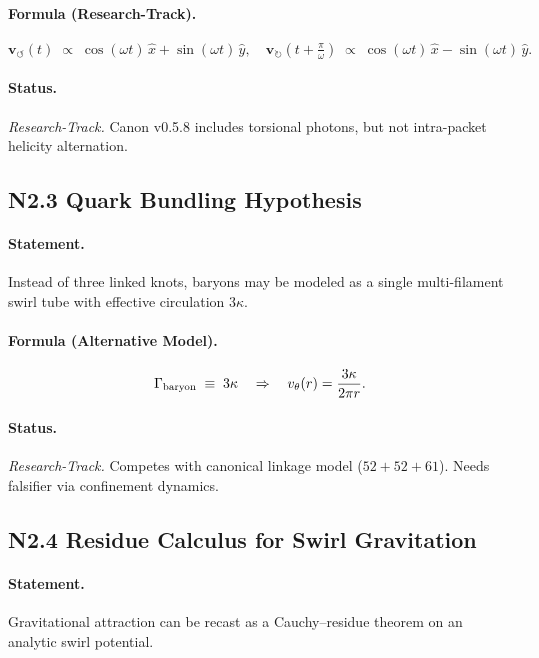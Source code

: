 \documentclass[10pt,reprint,aps,onecolumn,nofootinbib]{revtex4-2}
\begin{document}
    \paragraph{Formula (Research-Track).}
        \[
            \mathbf{v}_{\!\boldsymbol{\circlearrowleft}}(t) \;\propto\;
            \cos(\omega t)\,\hat{x} + \sin(\omega t)\,\hat{y},
            \quad
            \mathbf{v}_{\!\boldsymbol{\circlearrowright}}(t+\tfrac{\pi}{\omega})\;\propto\;
            \cos(\omega t)\,\hat{x} - \sin(\omega t)\,\hat{y}.
        \]

    \paragraph{Status.} \emph{Research-Track.} Canon v0.5.8 includes torsional photons, but not
        intra-packet helicity alternation.

    \subsection*{N2.3 Quark Bundling Hypothesis}
    \paragraph{Statement.}
        Instead of three linked knots, baryons may be modeled as a single multi-filament swirl tube
        with effective circulation $3\kappa$.

    \paragraph{Formula (Alternative Model).}
        \[
            \Gamma_{\rm baryon} \;\equiv\; 3\kappa
            \quad\Rightarrow\quad
            v_\theta(r) = \frac{3\kappa}{2\pi r}.
        \]

    \paragraph{Status.} \emph{Research-Track.} Competes with canonical linkage model
        ($52+52+61$). Needs falsifier via confinement dynamics.

    \subsection*{N2.4 Residue Calculus for Swirl Gravitation}
    \paragraph{Statement.}
        Gravitational attraction can be recast as a Cauchy–residue theorem on an analytic swirl potential.
\end{document}
